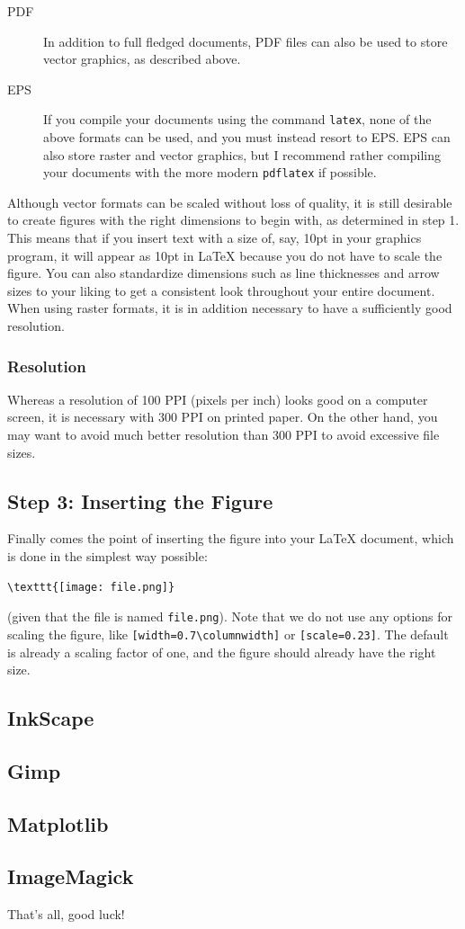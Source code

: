 \documentclass[a4paper,twocolumn]{article}
\begin{document}
\begin{description}
    \item[PDF] In addition to full fledged documents, PDF files can also be used to store vector graphics, as described above.
    \item[EPS] If you compile your documents using the command \verb|latex|, none of the above formats can be used, and you must instead resort to EPS. EPS can also store raster and vector graphics, but I recommend rather compiling your documents with the more modern \verb|pdflatex| if possible.
\end{description}

Although vector formats can be scaled without loss of quality, it is still desirable to create figures with the right dimensions to begin with, as determined in step 1. This means that if you insert text with a size of, say, 10pt in your graphics program, it will appear as 10pt in \LaTeX{} because you do not have to scale the figure. You can also standardize dimensions such as line thicknesses and arrow sizes to your liking to get a consistent look throughout your entire document.
When using raster formats, it is in addition necessary to have a sufficiently good resolution.

\subsubsection{Resolution}
Whereas a resolution of 100 PPI (pixels per inch) looks good on a computer screen, it is necessary with 300 PPI on printed paper.
On the other hand, you may want to avoid much better resolution than 300 PPI to avoid excessive file sizes.

\subsection{Step 3: Inserting the Figure}
Finally comes the point of inserting the figure into your \LaTeX{} document, which is done in the simplest way possible:

\begin{verbatim}
\texttt{[image: file.png]}
\end{verbatim}
(given that the file is named \verb|file.png|). Note that we do not use any options for scaling the figure, like \verb|[width=0.7\columnwidth]| or \verb|[scale=0.23]|. The default is already a scaling factor of one, and the figure should already have the right size.
\\

\subsection{InkScape}
\subsection{Gimp}
\subsection{Matplotlib}
\subsection{ImageMagick}


That's all, good luck!
\end{document}
